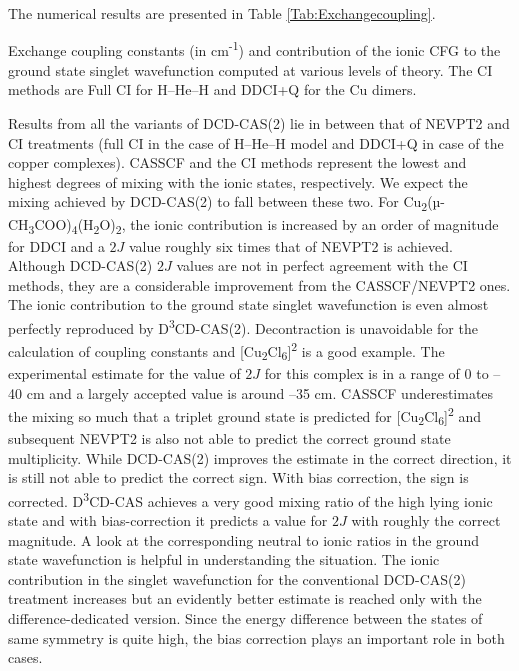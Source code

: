 The numerical results are presented in Table \ref{Tab:Exchangecoupling}.
\begin{table}
\small
\centering
\ttabbox
{\caption[Exchange coupling constants and contribution of the ionic CFG to the ground state singlet wavefunction.]{Exchange coupling constants (in cm\textsuperscript{-1}) and contribution of the ionic CFG to the ground state singlet wavefunction computed at various levels of theory. The CI methods are Full CI for H--He--H and DDCI+Q for the Cu dimers.}
\label{Tab:Exchangecoupling}}
{}
\end{table}
Results from all the variants of DCD-CAS(2) lie in between that of NEVPT2 and CI treatments (full CI in the case of H--He--H model and DDCI+Q in case of the copper complexes). CASSCF and the CI methods represent the lowest and highest degrees of mixing with the ionic states, respectively. We expect the mixing achieved by DCD-CAS(2) to fall between these two. For Cu\textsubscript{2}(µ-CH\textsubscript{3}COO)\textsubscript{4}(H\textsubscript{2}O)\textsubscript{2}, the ionic contribution is increased by an order of magnitude for DDCI and a $2J$ value roughly six times that of NEVPT2 is achieved. Although DCD-CAS(2) $2J$ values are not in perfect agreement with the CI methods, they are a considerable improvement from the CASSCF/NEVPT2 ones. The ionic contribution to the ground state singlet wavefunction is even almost perfectly reproduced by D\textsuperscript{3}CD-CAS(2). Decontraction is unavoidable for the calculation of coupling constants and [Cu\textsubscript{2}Cl\textsubscript{6}]\textsuperscript{2\textminus} is a good example. The experimental estimate for the value of $2J$ for this complex is in a range of 0 to –40 cm\textsuperscript{}\cite{CasteMC_1994_377} and a largely accepted value is around –35 cm\textsuperscript{}.\cite{CalzaCMC_2002_3985} CASSCF underestimates the mixing so much that a triplet ground state is predicted for [Cu\textsubscript{2}Cl\textsubscript{6}]\textsuperscript{2\textminus} and subsequent NEVPT2 is also not able to predict the correct ground state multiplicity. While DCD-CAS(2) improves the estimate in the correct direction, it is still not able to predict the correct sign. With bias correction, the sign is corrected. D\textsuperscript{3}CD-CAS achieves a very good mixing ratio of the high lying ionic state and with bias-correction it predicts a value for $2J$ with roughly the correct magnitude. 
A look at the corresponding neutral to ionic ratios in the ground state wavefunction is helpful in understanding the situation. The ionic contribution in the singlet wavefunction for the conventional DCD-CAS(2) treatment increases but an evidently better estimate is reached only with the difference-dedicated version. Since the energy difference between the states of same symmetry is quite high, the bias correction plays an important role in both cases. 
